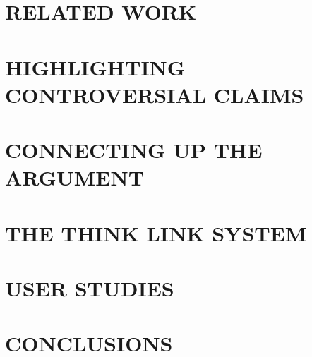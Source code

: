 \documentclass{chi2009}
\begin{document}
\section{RELATED WORK}


\section{HIGHLIGHTING CONTROVERSIAL CLAIMS}

\section{CONNECTING UP THE ARGUMENT}

\section{THE THINK LINK SYSTEM}

\section{USER STUDIES}

\section{CONCLUSIONS}



\end{document}
